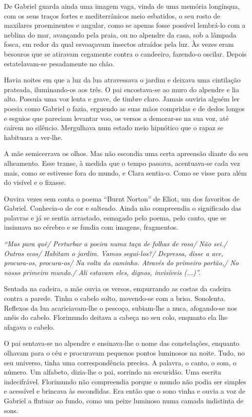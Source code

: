 De Gabriel guarda ainda uma imagem vaga, vinda de uma memória longínqua,
com os seus traços fortes e mediterrânicos meio esbatidos, o seu rosto
de maxilares proeminentes e angular, como se apenas fosse possível
lembrá-lo com a neblina do mar, avançando pela praia, ou no alpendre da
casa, sob a lâmpada fosca, em redor da qual esvoaçavam insectos atraídos
pela luz. Às vezes eram besouros que se atiravam cegamente contra o
candeeiro, fazendo-o oscilar. Depois estatelavam-se pesadamente no chão.

Havia noites em que a luz da lua atravessava o jardim e deixava uma
cintilação prateada, iluminando-os aos três. O pai encostava-se ao muro
do alpendre e lia alto. Possuía uma voz lenta e grave, de timbre claro.
Jamais ouviria alguém ler poesia como Gabriel o fazia, erguendo as suas
mãos compridas e de dedos longos e esguios que pareciam levantar voo, os
versos a demorar-se na sua voz, até caírem no silêncio. Mergulhava num
estado meio hipnótico que o rapaz se habituara a ver-lhe.

A mãe semicerrava os olhos. Mas não escondia uma certa apreensão diante
do seu alheamento. Esse transe, à medida que o tempo passava,
acentuava-se cada vez mais, como se estivesse fora do mundo, e Clara
sentia-o. Como se visse para além do visível e o fixasse.

Ouvira vezes sem conta o poema ``Burnt Norton'' de Eliot, um dos
favoritos de Gabriel. Conhecia-o de cor e salteado. Ainda não
compreendia o significado das palavras e já se sentia arrastado,
esmagado pelo poema, pelo canto, que se insinuava no cérebro e se fundia
com imagens, fragmentos.

\emph{``Mas para quê/ Perturbar a poeira numa taça de folhas de rosa/
Não sei./ Outros ecos/ Habitam o jardim. Vamos segui-los?/ Depressa,
disse a ave, procura-os, procura-os/ Na volta do caminho. Através do
primeiro portão,/ No nosso primeiro mundo./ Ali estavam eles, dignos,
invisíveis (...)''.}

Sentada na cadeira, a mãe ouvia os versos, empurrando as costas da
cadeira contra a parede. Tinha o cabelo solto, movendo-se com a brisa.
Sonolenta. Reflexos da lua acariciavam-lhe o pescoço, subiam-lhe a nuca,
afogando-se nos anéis do cabelo. Florimundo deitava a cabeça no seu
colo, enquanto ela lhe afagava o cabelo.

O pai sentava-se no alpendre e ensinava-lhe o nome das constelações,
enquanto olhavam para o céu e procuravam pequenos pontos luminosos na
noite. Tudo, no seu universo, tinha uma correspondência precisa. A
palavra, o canto, o som, o número. Um alfabeto, dizia-lhe o pai,
sorrindo na escuridão. Uma escrita indecifrável. Florimundo não
compreendia porque o mundo não podia ser simples e acessível e brincava
às escondidas. Era então que o sono vinha e ouvia a voz de Gabriel a
flutuar ao fundo, como um peixe luminoso numa camada indistinta de sons.

